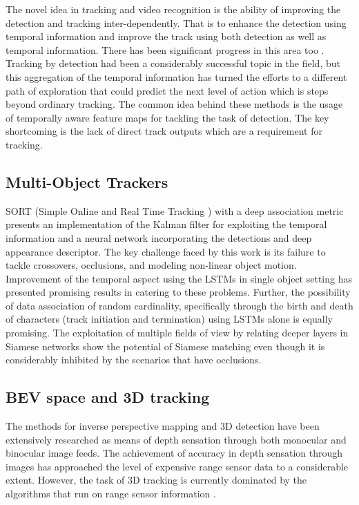 The novel idea in tracking and video recognition is the ability of improving the detection and tracking inter-dependently. That is to enhance the detection using temporal information and improve the track using both detection as well as temporal information. There has been significant progress in this area too \cite{DeepSiam:Tracktodetect, DeepSiam:mobvid}. Tracking by detection had been a considerably successful topic in the field, but this aggregation of the temporal information has turned the efforts to a different path of exploration that could predict the next level of action which is steps beyond ordinary tracking. The common idea behind these methods is the usage of temporally aware feature maps for tackling the task of detection. The key shortcoming is the lack of direct track outputs which are a requirement for tracking. 

\subsection{Multi-Object Trackers}

SORT (Simple Online and Real Time Tracking \cite{DeepSiam:Sort}) with a deep association metric \cite{DeepSiam:deepSort} presents an implementation of the Kalman filter for exploiting the temporal information and a neural network incorporating the detections and deep appearance descriptor. The key challenge faced by this work is its failure to tackle crossovers, occlusions, and modeling non-linear object motion. Improvement of the temporal aspect using the LSTMs in single object setting \cite{DeepSiam:multitarget} has presented promising results in catering to these problems. Further, the possibility of data association of random cardinality, specifically through the birth and death of characters (track initiation and termination) using LSTMs alone \cite{DeepSiam:multitarget} is equally promising. The exploitation of multiple fields of view by relating deeper layers in Siamese networks \cite{DeepSiam:multicontext} show the potential of Siamese matching even though it is considerably inhibited by the scenarios that have occlusions.

\subsection{BEV space and 3D tracking}

The methods for inverse perspective mapping and 3D detection have been extensively researched as means of depth sensation through both monocular \cite{DeepSiam:triangulation, DeepSiam:perspective} and binocular \cite{DeepSiam:triangulation} image feeds. The achievement of accuracy in depth sensation through images has approached the level of expensive range sensor data to a considerable extent. However, the task of 3D tracking is currently dominated by the algorithms that run on range sensor information \cite{DeepSiam:fastandfurious}.


